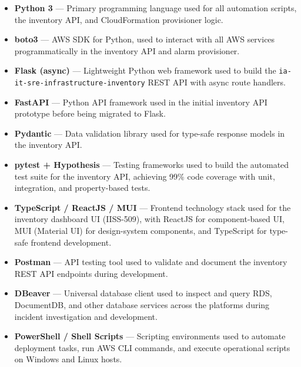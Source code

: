 \begin{itemize}

    \item \textbf{Python 3} --- Primary programming language used for
          all automation scripts, the inventory API, and CloudFormation
          provisioner logic.

    \item \textbf{boto3} --- AWS SDK for Python, used to interact with
          all AWS services programmatically in the inventory API and
          alarm provisioner.

    \item \textbf{Flask (async)} --- Lightweight Python web framework
          used to build the \texttt{ia-it-sre-infrastructure-inventory}
          REST API with async route handlers.

    \item \textbf{FastAPI} --- Python API framework used in the initial
          inventory API prototype before being migrated to Flask.

    \item \textbf{Pydantic} --- Data validation library used for
          type-safe response models in the inventory API.

    \item \textbf{pytest + Hypothesis} --- Testing frameworks used to
          build the automated test suite for the inventory API, achieving
          99\% code coverage with unit, integration, and property-based tests.

    \item \textbf{TypeScript / ReactJS / MUI} --- Frontend technology
          stack used for the inventory dashboard UI (IISS-509), with
          ReactJS for component-based UI, MUI (Material UI) for
          design-system components, and TypeScript for type-safe
          frontend development.

    \item \textbf{Postman} --- API testing tool used to validate and
          document the inventory REST API endpoints during development.

    \item \textbf{DBeaver} --- Universal database client used to inspect
          and query RDS, DocumentDB, and other database services across
          the platforms during incident investigation and development.

    \item \textbf{PowerShell / Shell Scripts} --- Scripting environments
          used to automate deployment tasks, run AWS CLI commands, and
          execute operational scripts on Windows and Linux hosts.


\end{itemize}
